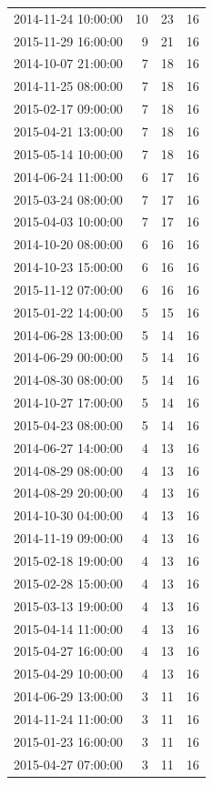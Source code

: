 \begin{tabular}{lrrr}
2014-11-24 10:00:00 & 10 & 23 & 16 \\
2015-11-29 16:00:00 & 9 & 21 & 16 \\
2014-10-07 21:00:00 & 7 & 18 & 16 \\
2014-11-25 08:00:00 & 7 & 18 & 16 \\
2015-02-17 09:00:00 & 7 & 18 & 16 \\
2015-04-21 13:00:00 & 7 & 18 & 16 \\
2015-05-14 10:00:00 & 7 & 18 & 16 \\
2014-06-24 11:00:00 & 6 & 17 & 16 \\
2015-03-24 08:00:00 & 7 & 17 & 16 \\
2015-04-03 10:00:00 & 7 & 17 & 16 \\
2014-10-20 08:00:00 & 6 & 16 & 16 \\
2014-10-23 15:00:00 & 6 & 16 & 16 \\
2015-11-12 07:00:00 & 6 & 16 & 16 \\
2015-01-22 14:00:00 & 5 & 15 & 16 \\
2014-06-28 13:00:00 & 5 & 14 & 16 \\
2014-06-29 00:00:00 & 5 & 14 & 16 \\
2014-08-30 08:00:00 & 5 & 14 & 16 \\
2014-10-27 17:00:00 & 5 & 14 & 16 \\
2015-04-23 08:00:00 & 5 & 14 & 16 \\
2014-06-27 14:00:00 & 4 & 13 & 16 \\
2014-08-29 08:00:00 & 4 & 13 & 16 \\
2014-08-29 20:00:00 & 4 & 13 & 16 \\
2014-10-30 04:00:00 & 4 & 13 & 16 \\
2014-11-19 09:00:00 & 4 & 13 & 16 \\
2015-02-18 19:00:00 & 4 & 13 & 16 \\
2015-02-28 15:00:00 & 4 & 13 & 16 \\
2015-03-13 19:00:00 & 4 & 13 & 16 \\
2015-04-14 11:00:00 & 4 & 13 & 16 \\
2015-04-27 16:00:00 & 4 & 13 & 16 \\
2015-04-29 10:00:00 & 4 & 13 & 16 \\
2014-06-29 13:00:00 & 3 & 11 & 16 \\
2014-11-24 11:00:00 & 3 & 11 & 16 \\
2015-01-23 16:00:00 & 3 & 11 & 16 \\
2015-04-27 07:00:00 & 3 & 11 & 16 \\

\end{tabular}
